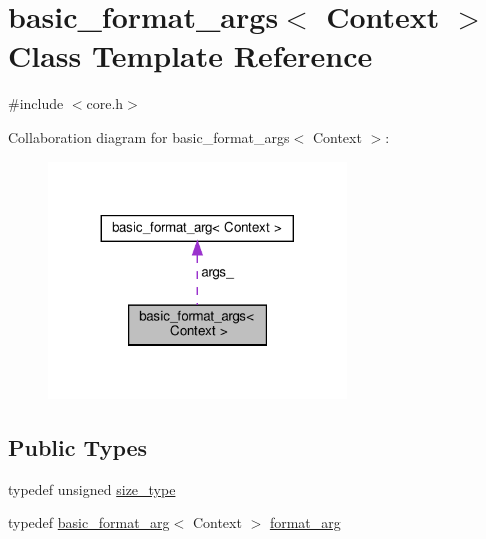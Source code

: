 \hypertarget{classbasic__format__args}{}\section{basic\+\_\+format\+\_\+args$<$ Context $>$ Class Template Reference}
\label{classbasic__format__args}


{\ttfamily \#include $<$core.\+h$>$}



Collaboration diagram for basic\+\_\+format\+\_\+args$<$ Context $>$\+:
\nopagebreak
\begin{figure}[H]
\begin{center}
\leavevmode
\includegraphics[width=224pt]{classbasic__format__args__coll__graph}
\end{center}
\end{figure}
\subsection*{Public Types}
\begin{DoxyCompactItemize}
\item 
typedef unsigned \hyperlink{classbasic__format__args_abced2890cde3213027d493494d89c611}{size\+\_\+type}
\item 
typedef \hyperlink{classbasic__format__arg}{basic\+\_\+format\+\_\+arg}$<$ Context $>$ \hyperlink{classbasic__format__args_aa8e7659bf8a41ef7cf889bd3edcbc129}{format\+\_\+arg}
\end{DoxyCompactItemize}
